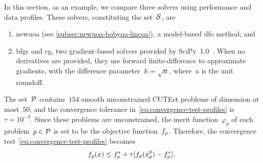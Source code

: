 In this section, as an example, we compare three solvers using performance and data profiles.
These solvers, constituting the set~$\mathcal{S}$, are
\begin{enumerate}
    \item \gls{newuoa} (see \cref{subsec:newuoa-bobyqa-lincoa}), a model-based \gls{dfo} method; and
    \item \gls{bfgs} and \gls{cg}, two gradient-based solvers provided by SciPy~1.0~\cite{Virtanen_Etal_2020}.
    When no derivatives are provided, they use forward finite-difference to approximate gradients, with the difference parameter~$h = \sqrt{u}$, where~$u$ is the unit roundoff.
\end{enumerate}
The set~$\mathcal{P}$ contains~$154$ smooth unconstrained CUTEst problems of dimension at most~$50$, and the convergence tolerance in~\cref{eq:convergence-test-profiles} is~$\tau = 10^{-3}$.
Since these problems are unconstrained, the merit function~$\varphi_p$ of each problem~$p \in \mathcal{P}$ is set to be the objective function~$f_p$.
Therefore, the convergence test~\cref{eq:convergence-test-profiles} becomes
\begin{equation}
    \label{eq:convergence-test-profiles-unconstrained}
    \obj_p(\iter) \le \obj_p^{\ast} + \tau [\obj_p(\iter_p^0) - \obj_p^{\ast}].
\end{equation}

